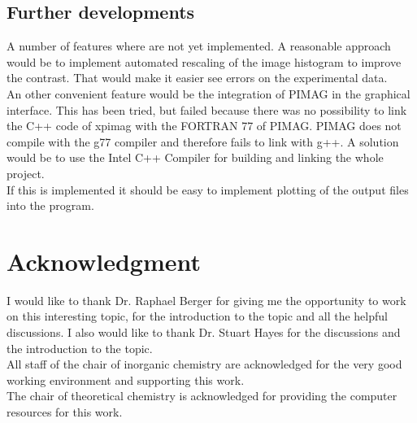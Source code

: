 \subsection{Further developments} 
A number of features where are not yet implemented. A reasonable approach would be to implement automated rescaling of the image histogram to improve the contrast. That would make it easier see errors on the experimental data. \\
An other convenient feature would be the integration of PIMAG in the graphical interface. This has been tried, but failed because there was no possibility to link the C++ code of xpimag with the FORTRAN 77 of PIMAG. PIMAG does not compile with the g77 compiler and therefore fails to link with g++. A solution would be to use the Intel C++ Compiler for building and linking the whole project. \\
If this is implemented it should be easy to implement plotting of the output files into the program.  
\newpage

\section*{Acknowledgment}
I would like to thank Dr. Raphael Berger for giving me the opportunity to work on this interesting topic, for the introduction to the topic and all the helpful discussions. I also would like to thank Dr. Stuart Hayes for the discussions and the introduction to the topic. \\
All staff of the chair of inorganic chemistry are acknowledged for the very good working  environment and supporting this work. \\
The chair of theoretical chemistry is acknowledged for providing the computer resources for this work. 
\newpage


